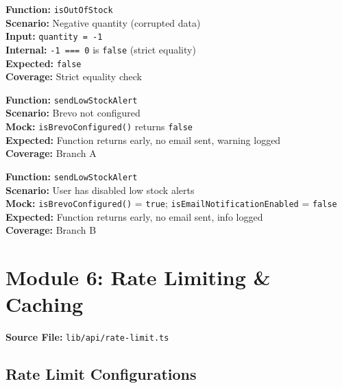 \documentclass[12pt,a4paper]{report}
\newcommand{\pone}{\textbf{\color{p1red}P1}}
\newcommand{\ptwo}{\textbf{\color{p2orange}P2}}
\begin{document}
\begin{tcolorbox}[testbox, title={EMAIL-009 \hfill \ptwo}]
\textbf{Function:} \texttt{isOutOfStock} \\
\textbf{Scenario:} Negative quantity (corrupted data) \\
\textbf{Input:} \texttt{quantity = -1} \\
\textbf{Internal:} \texttt{-1 === 0} is \texttt{false} (strict equality) \\
\textbf{Expected:} \texttt{false} \\
\textbf{Coverage:} Strict equality check
\end{tcolorbox}

\begin{tcolorbox}[testbox, title={EMAIL-010 \hfill \pone}]
\textbf{Function:} \texttt{sendLowStockAlert} \\
\textbf{Scenario:} Brevo not configured \\
\textbf{Mock:} \texttt{isBrevoConfigured()} returns \texttt{false} \\
\textbf{Expected:} Function returns early, no email sent, warning logged \\
\textbf{Coverage:} Branch A
\end{tcolorbox}

\begin{tcolorbox}[testbox, title={EMAIL-011 \hfill \ptwo}]
\textbf{Function:} \texttt{sendLowStockAlert} \\
\textbf{Scenario:} User has disabled low stock alerts \\
\textbf{Mock:} \texttt{isBrevoConfigured()} = \texttt{true}; \texttt{isEmailNotificationEnabled} = \texttt{false} \\
\textbf{Expected:} Function returns early, no email sent, info logged \\
\textbf{Coverage:} Branch B
\end{tcolorbox}


\chapter{Module 6: Rate Limiting \& Caching}

\textbf{Source File:} \texttt{lib/api/rate-limit.ts}

\section{Rate Limit Configurations}
\end{document}
